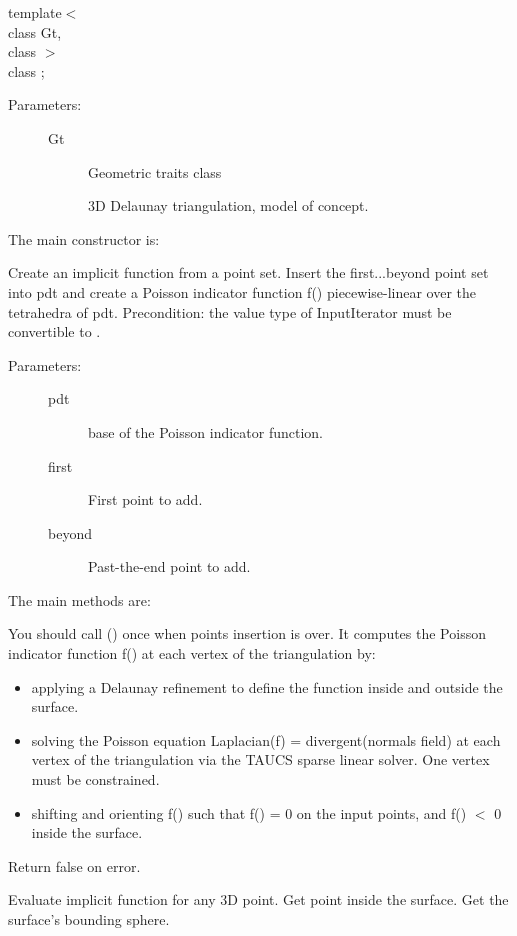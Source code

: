 template$<$  \\
class Gt,   \\
class $>$   \\
class ;
\ccGlue
\begin{description}
\item[Parameters:]
\begin{description}
\item[Gt]Geometric traits class \item[]3D Delaunay triangulation, model of  concept. \end{description}
\end{description}

The main constructor is:

{
Create an implicit function from a point set. Insert the first...beyond point set into pdt and create a Poisson indicator function f() piecewise-linear over the tetrahedra of pdt.
Precondition: the value type of InputIterator must be convertible to .
}
\ccGlue
\begin{description}
\item[Parameters:]
\begin{description}
\item[pdt] base of the Poisson indicator function. \item[first]First point to add. \item[beyond]Past-the-end point to add. \end{description}
\end{description}

The main methods are:

{
You should call () once when points insertion is over. It computes the Poisson indicator function f() at each vertex of the triangulation by:\begin{itemize}
\item applying a Delaunay refinement to define the function inside and outside the surface.\item solving the Poisson equation Laplacian(f) = divergent(normals field) at each vertex of the triangulation via the TAUCS sparse linear solver. One vertex must be constrained.\item shifting and orienting f() such that f() = 0 on the input points, and f() $<$ 0 inside the surface.\end{itemize}
Return false on error.
}
\ccGlue
{}
{
Evaluate implicit function for any 3D point.
}
\ccGlue
{}
{
Get point inside the surface.
}
{
Get the surface's bounding sphere.
}

